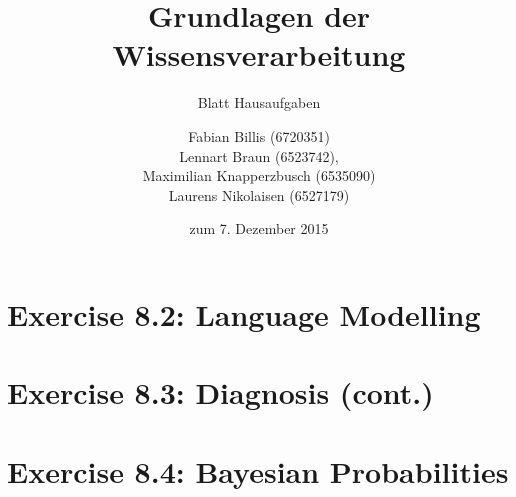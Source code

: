 \documentclass[a4paper]{scrartcl}
\title{Grundlagen der Wissensverarbeitung}
\subtitle{Blatt {\blattnr} Hausaufgaben}
\author{
    Fabian Billis (6720351) \\
    Lennart Braun (6523742), \\
    Maximilian Knapperzbusch (6535090) \\
    Laurens Nikolaisen (6527179) \\
}
\date{zum 7. Dezember 2015}
\def \blattnr {8}
\begin{document}
\maketitle

\section*{Exercise \blattnr.2: Language Modelling}

\section*{Exercise \blattnr.3: Diagnosis (cont.)}

\section*{Exercise \blattnr.4: Bayesian Probabilities}
\end{document}
